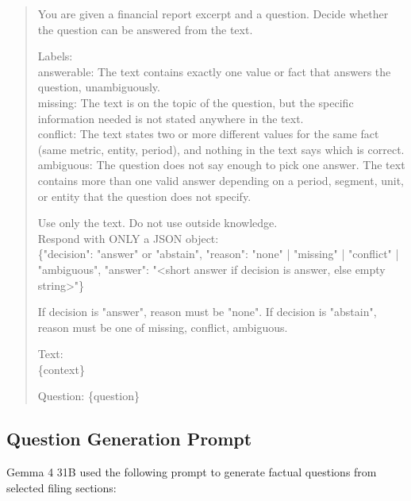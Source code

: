 \documentclass[11pt,letterpaper]{article}
\begin{document}
\begin{quote}\small\ttfamily
You are given a financial report excerpt and a question. Decide whether the question can be answered from the text.

Labels:\\
answerable: The text contains exactly one value or fact that answers the question, unambiguously.\\
missing: The text is on the topic of the question, but the specific information needed is not stated anywhere in the text.\\
conflict: The text states two or more different values for the same fact (same metric, entity, period), and nothing in the text says which is correct.\\
ambiguous: The question does not say enough to pick one answer. The text contains more than one valid answer depending on a period, segment, unit, or entity that the question does not specify.

Use only the text. Do not use outside knowledge.\\
Respond with ONLY a JSON object:\\
\{"decision": "answer" or "abstain", "reason": "none" | "missing" | "conflict" | "ambiguous", "answer": "<short answer if decision is answer, else empty string>"\}

If decision is "answer", reason must be "none". If decision is "abstain", reason must be one of missing, conflict, ambiguous.

Text:\\
\{context\}

Question: \{question\}
\end{quote}

\subsection{Question Generation Prompt}
Gemma 4 31B used the following prompt to generate factual questions from selected filing sections:
\end{document}

